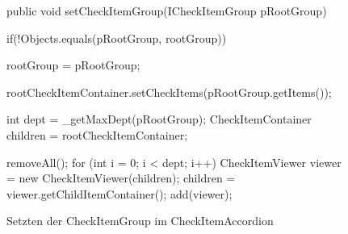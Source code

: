 \begin{wrapfigure}[16]{r}[0px]{322px}
    \centering
	\vspace{-5px}
	\begin{spacing}{0.75}
		\begin{javacode}[firstnumber=62]
public void setCheckItemGroup(ICheckItemGroup pRootGroup)
{
  if(!Objects.equals(pRootGroup, rootGroup))
  {
    rootGroup = pRootGroup;
    
    rootCheckItemContainer.setCheckItems(pRootGroup.getItems());
    
    int dept = _getMaxDept(pRootGroup);
    CheckItemContainer children = rootCheckItemContainer;
    
    removeAll();
    for (int i = 0; i < dept; i++)
    {
      CheckItemViewer viewer = new CheckItemViewer(children);
      children = viewer.getChildItemContainer();
      add(viewer);
    }
  }
}\end{javacode}
	\end{spacing}
	\caption{Setzten der CheckItemGroup im CheckItemAccordion}
	\label{fig:CheckItemAccordion-setCheckItemGroup}
\end{wrapfigure}